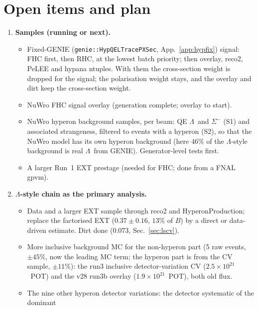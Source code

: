 \documentclass[11pt,a4paper]{article}
\newcommand{\Lam}{\ensuremath{\Lambda}}
\begin{document}
\section{Open items and plan}
\label{sec:plan}

\begin{enumerate}
  \item \textbf{Samples (running or next).}
  \begin{itemize}
    \item Fixed-GENIE (\texttt{genie::HypQELTracePXSec}, App.~\ref{app:hypfix}) signal: FHC
          first, then RHC, at the lowest batch priority; then overlay, reco2, PeLEE and hypana
          ntuples. With them the cross-section weight is dropped for the signal; the
          polarisation weight stays, and the overlay and dirt keep the cross-section weight.
    \item NuWro FHC signal overlay (generation complete; overlay to start).
    \item NuWro hyperon background samples, per beam: QE \Lam\ and $\Sigma^-$ (S1) and
          associated strangeness, filtered to events with a hyperon (S2), so that the NuWro
          model has its own hyperon background (here $46\%$ of the \Lam-style background is
          real \Lam\ from GENIE). Generator-level tests first.
    \item A larger Run~1 EXT prestage (needed for FHC; done from a FNAL gpvm).
  \end{itemize}
  \item \textbf{\Lam-style chain as the primary analysis.}
  \begin{itemize}
    \item Data and a larger EXT sample through reco2 and HyperonProduction; replace the
          factorised EXT ($0.37\pm0.16$, $13\%$ of $B$) by a direct or data-driven estimate.
          Dirt done ($0.073$, Sec.~\ref{sec:lscv}).
    \item More inclusive background MC for the non-hyperon part (5 raw events, $\pm45\%$, now the
          leading MC term; the hyperon part is from the CV sample, $\pm11\%$): the run3 inclusive
          detector-variation CV ($2.5\times10^{21}$~POT) and the v28 run3b overlay
          ($1.9\times10^{21}$~POT), both old flux.
    \item The nine other hyperon detector variations: the detector systematic of the dominant

\end{itemize}
\end{enumerate}
\end{document}
